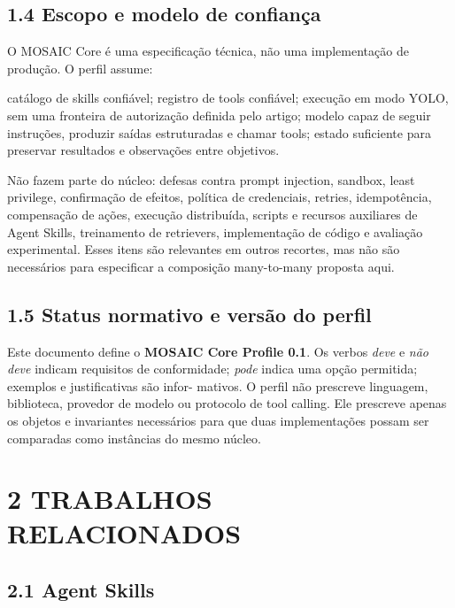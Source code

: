 \documentclass[12pt,a4paper]{article}
\begin{document}
\subsection*{1.4 Escopo e modelo de confiança}

O MOSAIC Core é uma especificação técnica, não uma implementação de produção. O perfil assume:


\noindent \textbullet{} catálogo de skills confiável; \textbullet{} registro de tools confiável; \textbullet{} execução em modo YOLO, sem uma fronteira de autorização definida pelo artigo; \textbullet{} modelo capaz de seguir instruções, produzir saídas estruturadas e chamar tools; \textbullet{} estado suficiente para preservar resultados e observações entre objetivos.\par

Não fazem parte do núcleo: defesas contra prompt injection, sandbox, least privilege, confirmação de efeitos, política de credenciais, retries, idempotência, compensação de ações, execução distribuída, scripts e recursos auxiliares de Agent Skills, treinamento de retrievers, implementação de código e avaliação experimental. Esses itens são relevantes em outros recortes, mas não são necessários para especificar a composição many-to-many proposta aqui.


\subsection*{1.5 Status normativo e versão do perfil}

Este documento define o\textbf{ MOSAIC Core Profile 0.1}. Os verbos\textit{ deve} e\textit{ não deve} indicam requisitos de conformidade;\textit{ pode} indica uma opção permitida; exemplos e justificativas são infor- mativos. O perfil não prescreve linguagem, biblioteca, provedor de modelo ou protocolo de tool calling. Ele prescreve apenas os objetos e invariantes necessários para que duas implementações possam ser comparadas como instâncias do mesmo núcleo.



\section*{2 TRABALHOS RELACIONADOS}

\subsection*{2.1 Agent Skills}
\end{document}
